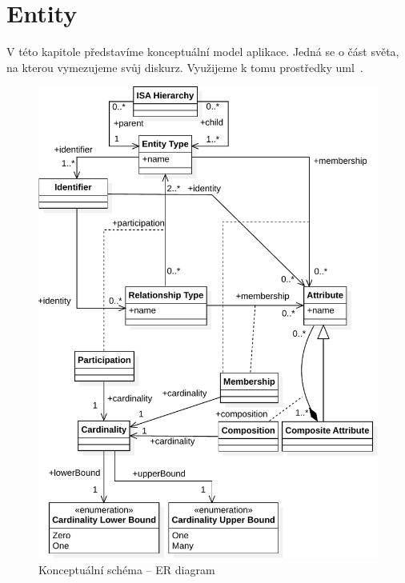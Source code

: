 \section{Entity}\label{section:conceptual-model}

V této kapitole představíme konceptuální model aplikace.
Jedná se o část světa, na kterou vymezujeme svůj diskurz.
Využijeme k tomu prostředky \acrfull{uml}~\cite{omg_uml_2017}.

\begin{figure}[!htb]
  \centering
  \includegraphics[width=\maxwidth{\textwidth}]{../img/diagrams/er-diagram-model.pdf}
  \caption{Konceptuální schéma -- ER diagram}
  \label{fig:class-diagram:er-diagram}
\end{figure}

